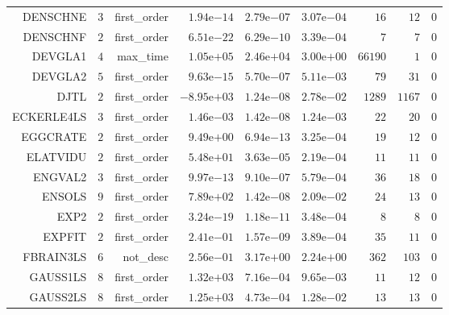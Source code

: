 \begin{longtable}{rrrrrrrrr}
DENSCHNE & \(     3\) & first\_order & \( 1.94\)e\(-14\) & \( 2.79\)e\(-07\) & \( 3.07\)e\(-04\) & \(    16\) & \(    12\) & \(     0\) \\
DENSCHNF & \(     2\) & first\_order & \( 6.51\)e\(-22\) & \( 6.29\)e\(-10\) & \( 3.39\)e\(-04\) & \(     7\) & \(     7\) & \(     0\) \\
DEVGLA1 & \(     4\) & max\_time & \( 1.05\)e\(+05\) & \( 2.46\)e\(+04\) & \( 3.00\)e\(+00\) & \( 66190\) & \(     1\) & \(     0\) \\
DEVGLA2 & \(     5\) & first\_order & \( 9.63\)e\(-15\) & \( 5.70\)e\(-07\) & \( 5.11\)e\(-03\) & \(    79\) & \(    31\) & \(     0\) \\
DJTL & \(     2\) & first\_order & \(-8.95\)e\(+03\) & \( 1.24\)e\(-08\) & \( 2.78\)e\(-02\) & \(  1289\) & \(  1167\) & \(     0\) \\
ECKERLE4LS & \(     3\) & first\_order & \( 1.46\)e\(-03\) & \( 1.42\)e\(-08\) & \( 1.24\)e\(-03\) & \(    22\) & \(    20\) & \(     0\) \\
EGGCRATE & \(     2\) & first\_order & \( 9.49\)e\(+00\) & \( 6.94\)e\(-13\) & \( 3.25\)e\(-04\) & \(    19\) & \(    12\) & \(     0\) \\
ELATVIDU & \(     2\) & first\_order & \( 5.48\)e\(+01\) & \( 3.63\)e\(-05\) & \( 2.19\)e\(-04\) & \(    11\) & \(    11\) & \(     0\) \\
ENGVAL2 & \(     3\) & first\_order & \( 9.97\)e\(-13\) & \( 9.10\)e\(-07\) & \( 5.79\)e\(-04\) & \(    36\) & \(    18\) & \(     0\) \\
ENSOLS & \(     9\) & first\_order & \( 7.89\)e\(+02\) & \( 1.42\)e\(-08\) & \( 2.09\)e\(-02\) & \(    24\) & \(    13\) & \(     0\) \\
EXP2 & \(     2\) & first\_order & \( 3.24\)e\(-19\) & \( 1.18\)e\(-11\) & \( 3.48\)e\(-04\) & \(     8\) & \(     8\) & \(     0\) \\
EXPFIT & \(     2\) & first\_order & \( 2.41\)e\(-01\) & \( 1.57\)e\(-09\) & \( 3.89\)e\(-04\) & \(    35\) & \(    11\) & \(     0\) \\
FBRAIN3LS & \(     6\) & not\_desc & \( 2.56\)e\(-01\) & \( 3.17\)e\(+00\) & \( 2.24\)e\(+00\) & \(   362\) & \(   103\) & \(     0\) \\
GAUSS1LS & \(     8\) & first\_order & \( 1.32\)e\(+03\) & \( 7.16\)e\(-04\) & \( 9.65\)e\(-03\) & \(    11\) & \(    12\) & \(     0\) \\
GAUSS2LS & \(     8\) & first\_order & \( 1.25\)e\(+03\) & \( 4.73\)e\(-04\) & \( 1.28\)e\(-02\) & \(    13\) & \(    13\) & \(     0\) \\

\end{longtable}
